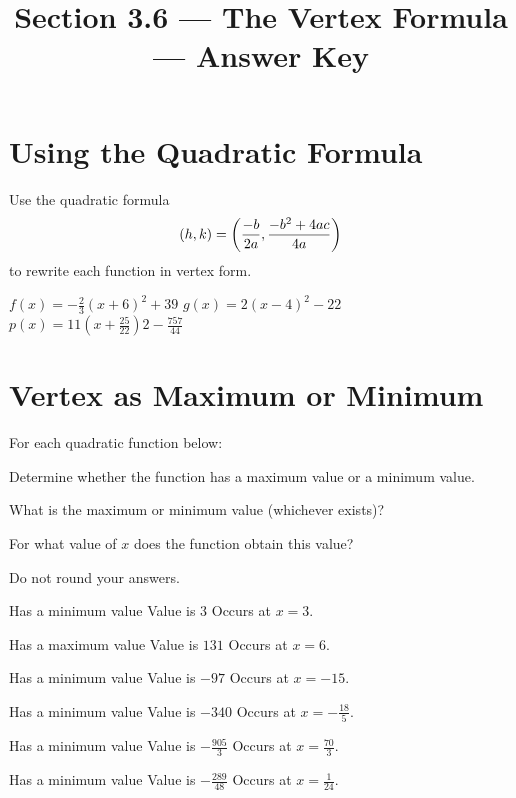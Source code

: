 

\title{Section 3.6 --- The Vertex Formula --- Answer Key}

\newcommand{\ans}[3]{%
\item
\begin{nmenum}
\mitemxxx
{Has a #1imum value}
{Value is $#2$}
{Occurs at $x=#3$.}
\end{nmenum}
}


\maketitle
\section*{Using the Quadratic Formula}
Use the quadratic formula
\[
\left(h,k\right)=\left(\dfrac{-b}{2a},\dfrac{-b^2+4ac}{4a}\right)
\]
to rewrite each function in vertex form.
\begin{smenum}
\mitemxxx
{$f(x)=-\frac{2}{3}(x+6)^2+39$}
{$g(x)=2(x-4)^2-22$}
{$p(x)=11\left(x+\frac{25}{22}\right)2-\frac{757}{44}$}
\end{smenum}

\section*{Vertex as Maximum or Minimum}
For each quadratic function below:
\begin{clist}
\item Determine whether the function has a maximum value or a minimum value.
\item What is the maximum or minimum value (whichever exists)?
\item For what value of $x$ does the function obtain this value?
\end{clist}
Do not round your answers.
\begin{senum}
\ans{min}{3}{3}
\ans{max}{131}{6}
\ans{min}{-97}{-15}
\ans{min}{-340}{-\frac{18}{5}}
\ans{min}{-\frac{905}{3}}{\frac{70}{3}}
\ans{min}{-\frac{289}{48}}{\frac{1}{24}}
\end{senum}

